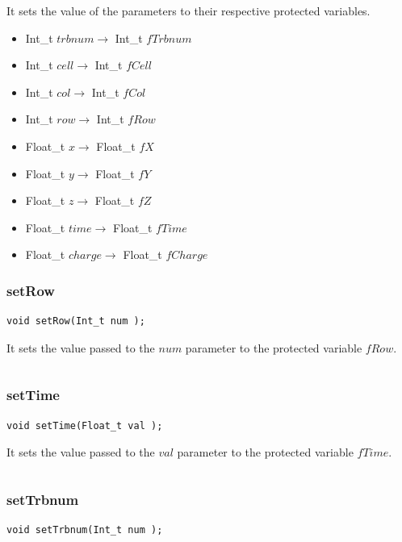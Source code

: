\documentclass[a4paper]{book}
\begin{document}
It sets the value of the parameters to their respective protected variables.

\begin{itemize}
	\item Int\_t $trbnum \rightarrow$ Int\_t $fTrbnum$
	\item Int\_t $cell \rightarrow$ Int\_t $fCell$
	\item Int\_t $col \rightarrow$ Int\_t $fCol$
	\item Int\_t $row \rightarrow$ Int\_t $fRow$
	\item Float\_t $x \rightarrow$ Float\_t $fX$
	\item Float\_t $y \rightarrow$ Float\_t $fY$
	\item Float\_t $z \rightarrow$ Float\_t $fZ$
	\item Float\_t $time \rightarrow$ Float\_t $fTime$
	\item Float\_t $charge \rightarrow$ Float\_t $fCharge$
\end{itemize}

\subsubsection{setRow}

\begin{lstlisting}
void setRow(Int_t num );
\end{lstlisting}

It sets the value passed to the $num$ parameter to the protected variable $fRow$.

\[\]

\subsubsection{setTime}

\begin{lstlisting}
void setTime(Float_t val );
\end{lstlisting}

It sets the value passed to the $val$ parameter to the protected variable $fTime$.

\[\]

\subsubsection{setTrbnum}

\begin{lstlisting}
void setTrbnum(Int_t num );
\end{lstlisting}
\end{document}
